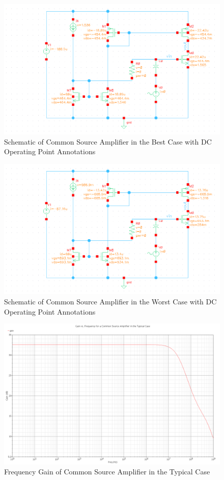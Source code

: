 \documentclass{article}
\begin{document}
\begin{figure}[H]
\centering
\includegraphics[width=6in]{2_cs_dcop_ff.png}
\caption{Schematic of Common Source Amplifier in the Best Case with DC Operating Point Annotations}
\label{cs_dcop_ff}
\end{figure}

\begin{figure}[H]
\centering
\includegraphics[width=6in]{2_cs_dcop_ss.png}
\caption{Schematic of Common Source Amplifier in the Worst Case with DC Operating Point Annotations}
\label{cs_dcop_ss}
\end{figure}

\begin{figure}[H]
\centering
\includegraphics[width=5in]{2_cs_gain_tt.png}
\caption{Frequency Gain of Common Source Amplifier in the Typical Case}
\label{cs_tt}
\end{figure}
\end{document}
